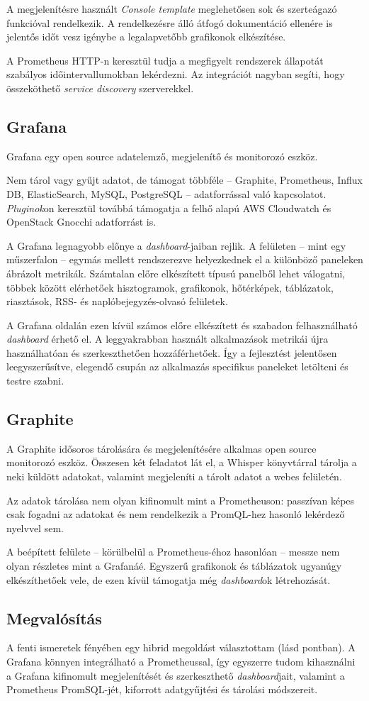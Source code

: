 A megjelenítésre használt \textit{Console template} meglehetősen sok és szerteágazó funkcióval rendelkezik. A rendelkezésre álló átfogó dokumentáció ellenére is jelentős időt vesz igénybe a legalapvetőbb grafikonok elkészítése.

A Prometheus HTTP-n keresztül tudja a megfigyelt rendszerek állapotát szabályos időintervallumokban lekérdezni. Az integrációt nagyban segíti, hogy összeköthető \textit{service discovery} szerverekkel.

\subsection{Grafana}
Grafana egy open source adatelemző, megjelenítő és monitorozó eszköz.

Nem tárol vagy gyűjt adatot, de támogat többféle --  Graphite, Prometheus, Influx DB, ElasticSearch, MySQL, PostgreSQL --   adatforrással való kapcsolatot. \textit{Pluginok}on keresztül továbbá támogatja a felhő alapú AWS Cloudwatch és OpenStack Gnocchi adatforrást is.


A Grafana legnagyobb előnye a \textit{dashboard}-jaiban rejlik. A felületen --  mint egy műszerfalon --   egymás mellett rendszerezve helyezkednek el a különböző paneleken ábrázolt metrikák. Számtalan előre elkészített típusú panelből lehet válogatni, többek között elérhetőek hisztogramok, grafikonok, hőtérképek, táblázatok, riasztások, RSS- és naplóbejegyzés-olvasó felületek.

A Grafana oldalán ezen kívül számos előre elkészített és szabadon felhasználható \textit{dashboard} érhető el. A leggyakrabban használt alkalmazások metrikái újra használhatóan és szerkeszthetően hozzáférhetőek. Így a fejlesztést jelentősen leegyszerűsítve, elegendő csupán az alkalmazás specifikus paneleket letölteni és testre szabni.

\subsection{Graphite}
A Graphite idősoros tárolására és megjelenítésére alkalmas open source monitorozó eszköz. Összesen két feladatot lát el, a Whisper könyvtárral tárolja a neki küldött adatokat, valamint megjeleníti a tárolt adatot a webes felületén.

Az adatok tárolása nem olyan kifinomult mint a Prometheuson: passzívan képes csak fogadni az adatokat és nem rendelkezik a PromQL-hez hasonló lekérdező nyelvvel sem.

A beépített felülete --  körülbelül a Prometheus-éhoz hasonlóan --   messze nem olyan részletes mint a Grafanáé. Egyszerű grafikonok és táblázatok ugyanúgy elkészíthetőek vele, de ezen kívül támogatja még \textit{dashboard}ok létrehozását.


\subsection{Megvalósítás}
A fenti ismeretek fényében egy hibrid megoldást választottam (lásd  pontban). A Grafana könnyen integrálható a Prometheussal, így egyszerre tudom kihasználni a Grafana kifinomult megjelenítését és szerkeszthető \textit{dashboard}jait, valamint a Prometheus PromSQL-jét, kiforrott adatgyűjtési és tárolási módszereit.